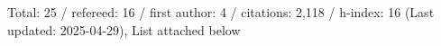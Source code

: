 Total: 25 / refereed: 16 / first author: 4 / citations: 2,118 / h-index: 16 (Last updated: 2025-04-29), List attached below
